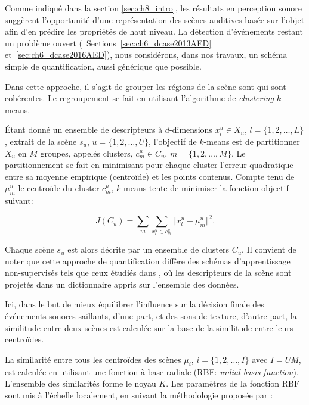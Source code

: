 Comme indiqué dans la section \ref{sec:ch8_intro}, les résultats en perception sonore suggèrent l'opportunité d'une représentation des scènes auditives basée sur l'objet afin d'en prédire les propriétés de haut niveau. La détection d'événements restant un problème ouvert (\cf~Sections~\ref{sec:ch6_dcase2013AED} et~\ref{sec:ch6_dcase2016AED}), nous considérons, dans nos travaux, un schéma simple de quantification, aussi générique que possible. 

Dans cette approche, il s'agit de grouper les régions de la scène sont qui sont cohérentes. Le regroupement se fait en utilisant l'algorithme de \emph{clustering} $k$-means.

Étant donné un ensemble de descripteurs à $d$-dimensions $x_l^u\in X_u$, $l=\lbrace 1,2,\ldots,L\rbrace$, extrait de la scène  $s_u$, $u=\lbrace 1,2,\ldots,U\rbrace$, l'objectif de $k$-means est de partitionner $X_u$ en $M$ groupes, appelés clusters, $c^u_m\in C_u$, $m=\lbrace 1,2,\ldots,M\rbrace$. Le partitionnement se fait en minimisant pour chaque cluster l'erreur quadratique entre sa moyenne empirique (centroïde) et les points contenus. Compte tenu de $\mu_m^u$ le centroïde du cluster $c_m^u$, $k$-means tente de minimiser la fonction objectif suivant:

\begin{equation}
J(C_u)=\sum\limits_{m} \sum_{x^u_l\in c^u_m} \Vert x_l^u - \mu_m^u \Vert^2\mbox{.}
\end{equation}

Chaque scène $s_u$ est alors décrite par un ensemble de clusters $C_u$. Il convient de noter que cette approche de quantification diffère des schémas d'apprentissage non-supervisés tels que ceux étudiés dans \cite{bisot2016acoustic}, où les descripteurs de la scène sont projetés dans un dictionnaire appris sur l'ensemble des données.

Ici, dans le but de mieux équilibrer l'influence sur la décision finale des événements sonores saillants, d'une part, et des sons de texture, d'autre part, la similitude entre deux scènes est calculée sur la base de la similitude entre leurs centroïdes.

La similarité entre tous les centroïdes des scènes $\mu_i$, $i=\lbrace1,2,\ldots,I \rbrace$ avec $I=UM$, est calculée en utilisant une fonction à base radiale (RBF: \emph{radial basis function}). L'ensemble des similarités forme le noyau $K$. Les paramètres de la fonction RBF sont mis à l'échelle localement, en suivant la méthodologie proposée par \citep{selfTuneManor2004}:

